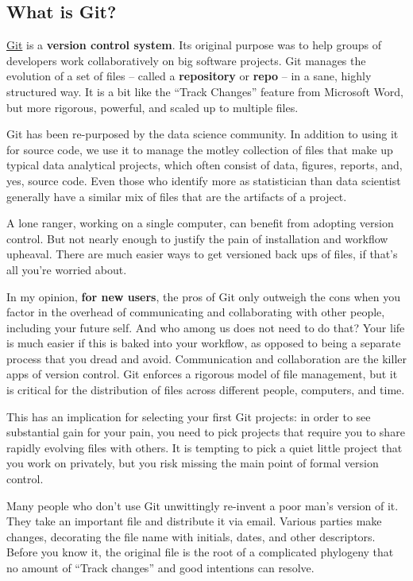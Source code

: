 \documentclass[12pt]{article}
\begin{document}
\subsection{What is Git?}\label{what-is-git}

\href{http://git-scm.com}{Git} is a \textbf{version control system}. Its
original purpose was to help groups of developers work collaboratively
on big software projects. Git manages the evolution of a set of files --
called a \textbf{repository} or \textbf{repo} -- in a sane, highly
structured way. It is a bit like the ``Track Changes'' feature from
Microsoft Word, but more rigorous, powerful, and scaled up to multiple
files.

Git has been re-purposed by the data science community. In addition to
using it for source code, we use it to manage the motley collection of
files that make up typical data analytical projects, which often consist
of data, figures, reports, and, yes, source code. Even those who
identify more as statistician than data scientist generally have a
similar mix of files that are the artifacts of a project.

A lone ranger, working on a single computer, can benefit from adopting
version control. But not nearly enough to justify the pain of
installation and workflow upheaval. There are much easier ways to get
versioned back ups of files, if that's all you're worried about.

In my opinion, \textbf{for new users}, the pros of Git only outweigh the
cons when you factor in the overhead of communicating and collaborating
with other people, including your future self. And who among us does not
need to do that? Your life is much easier if this is baked into your
workflow, as opposed to being a separate process that you dread and
avoid. Communication and collaboration are the killer apps of version
control. Git enforces a rigorous model of file management, but it is
critical for the distribution of files across different people,
computers, and time.

This has an implication for selecting your first Git projects: in order
to see substantial gain for your pain, you need to pick projects that
require you to share rapidly evolving files with others. It is tempting
to pick a quiet little project that you work on privately, but you risk
missing the main point of formal version control.

Many people who don't use Git unwittingly re-invent a poor man's version
of it. They take an important file and distribute it via email. Various
parties make changes, decorating the file name with initials, dates, and
other descriptors. Before you know it, the original file is the root of
a complicated phylogeny that no amount of ``Track changes'' and good
intentions can resolve.
\end{document}

